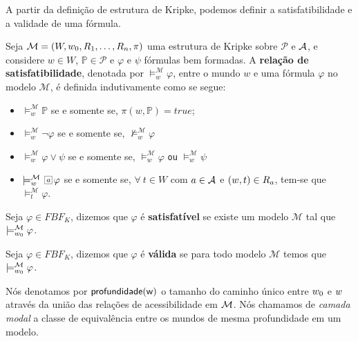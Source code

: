 A partir da definição de estrutura de Kripke, podemos definir a satisfatibilidade
e a validade de uma fórmula.
\begin{definition}
    Seja $\mathcal{M} = (W, w_0, R_1, \ldots, R_n, \pi)$ uma estrutura de Kripke sobre
    $\mathcal{P}$ e ${\cal{A}}$, e considere $w \in W$, $\mathbb{P} \in \mathcal{P}$
    e $\varphi$ e $\psi$ fórmulas bem formadas. A \textbf{relação de
    satisfatibilidade}, denotada por $\models ^{\mathcal{M}}_{w} \varphi$, entre
    o mundo $w$ e uma fórmula $\varphi$ no modelo $\mathcal{M}$, é definida
    indutivamente como se segue:
    \begin{itemize}
        \item $\models ^{\mathcal{M}}_{w} \mathbb{P}$ se e somente se, $\pi(w,\mathbb{P}) =
            true$;
        \item $\models ^{\mathcal{M}}_{w} \neg \varphi$ se e somente se,
            $\not\models ^{\mathcal{M}}_{w} \varphi$
            
        \item $\models ^{\mathcal{M}}_{w} \varphi \vee \psi$ se e somente se,
            $\models ^{\mathcal{M}}_{w} \varphi$ \texttt{ou} $\models
            ^{\mathcal{M}}_{w} \psi$
        \item $\models ^{\mathcal{M}}_{w} \nec{\agent} \varphi$ se e somente se,
            $\forall~t \in W$ com $a \in {\cal{A}}$  e $(w,t) \in R_{a}$,
            tem-se que $\models ^{\mathcal{M}}_{t} \varphi$. 
    \end{itemize}
\end{definition}

\begin{definition}
    Seja $\varphi \in FBF_{K}$, dizemos que $\varphi$ é
    \textbf{satisfatível} se existe um modelo $\mathcal{M}$ tal que $\models ^{\mathcal{M}}_{w_0} \varphi$.  
\end{definition}

\begin{definition}
    Seja $\varphi \in FBF_{K}$, dizemos que $\varphi$ é
    \textbf{válida} se para todo modelo $\mathcal{M}$ temos que $\models ^{\mathcal{M}}_{w_0} \varphi$.  
\end{definition}

Nós denotamos por $\sf profundidade(w)$ o tamanho do caminho único entre $w_0$ e  $w$
através da união das relações de acessibilidade em ${\cal M}$. 
Nós chamamos de \emph{camada modal} a classe de equivalência entre os mundos de
mesma profundidade em um modelo.

